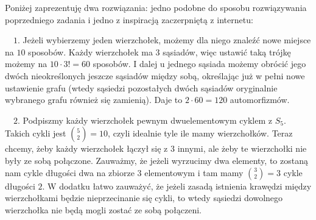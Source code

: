 \documentclass{article}
\begin{document}
\begin{center}
\scalebox{.6}
{
}
\end{center}
    Poniżej zaprezentuję dwa rozwiązania: jedno podobne do sposobu rozwiązywania poprzedniego zadania i jedno z inspiracją zaczerpniętą z internetu:
    \medskip

    $\quad1.$ Jeżeli wybierzemy jeden wierzchołek, możemy dla niego znaleźć nowe miejsce na $10$ sposobów. Każdy wierzchołek ma $3$ sąsiadów, więc ustawić taką trójkę możemy na $10\cdot3!=60$ sposobów. I dalej u jednego sąsiada możemy obrócić jego dwóch nieokreślonych jeszcze sąsiadów między sobą, określając już w pełni nowe ustawienie grafu (wtedy sąsiedzi pozostałych dwóch sąsiadów oryginalnie wybranego grafu również się zamienią). Daje to $2\cdot 60=120$ automorfizmów.
    \medskip

    $\quad2.$ Podpiszmy każdy wierzchołek pewnym dwuelementowym cyklem z $S_5$. Takich cykli jest ${5\choose 2}=10$, czyli idealnie tyle ile mamy wierzchołków. Teraz chcemy, żeby każdy wierzchołek łączył się z $3$ innymi, ale żeby te wierzchołki nie były ze sobą połączone. Zauważmy, że jeżeli wyrzucimy dwa elementy, to zostaną nam cykle długości dwa na zbiorze $3$ elementowym i tam mamy ${3\choose 2}=3$ cykle długości $2$. W dodatku łatwo zauważyć, że jeżeli zasadą istnienia krawędzi między wierzchołkami będzie nieprzecinanie się cykli, to wtedy sąsiedzi dowolnego wierzchołka nie będą mogli zostać ze sobą połączeni.
\end{document}
